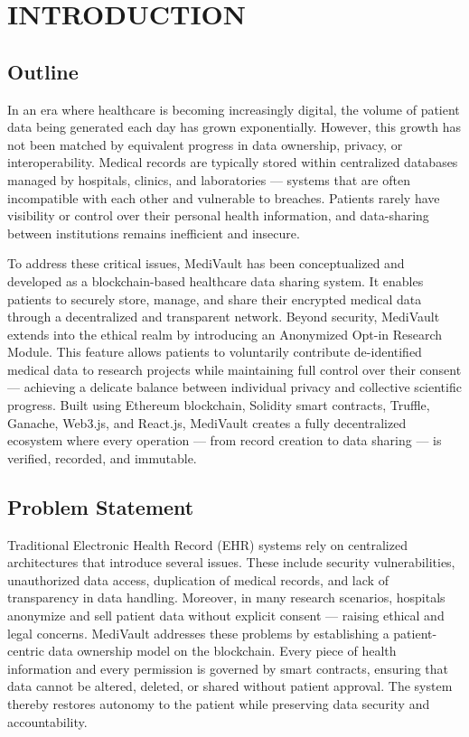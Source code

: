 \chapter{INTRODUCTION}
\label{chap:introduction}

\section{Outline}
In an era where healthcare is becoming increasingly digital, the volume of patient data being generated each day has grown exponentially. However, this growth has not been matched by equivalent progress in data ownership, privacy, or interoperability. Medical records are typically stored within centralized databases managed by hospitals, clinics, and laboratories — systems that are often incompatible with each other and vulnerable to breaches. Patients rarely have visibility or control over their personal health information, and data-sharing between institutions remains inefficient and insecure.

To address these critical issues, MediVault has been conceptualized and developed as a blockchain-based healthcare data sharing system. It enables patients to securely store, manage, and share their encrypted medical data through a decentralized and transparent network. Beyond security, MediVault extends into the ethical realm by introducing an Anonymized Opt-in Research Module. This feature allows patients to voluntarily contribute de-identified medical data to research projects while maintaining full control over their consent — achieving a delicate balance between individual privacy and collective scientific progress. Built using Ethereum blockchain, Solidity smart contracts, Truffle, Ganache, Web3.js, and React.js, MediVault creates a fully decentralized ecosystem where every operation — from record creation to data sharing — is verified, recorded, and immutable.

\section{Problem Statement}
Traditional Electronic Health Record (EHR) systems rely on centralized architectures that introduce several issues. These include security vulnerabilities, unauthorized data access, duplication of medical records, and lack of transparency in data handling. Moreover, in many research scenarios, hospitals anonymize and sell patient data without explicit consent — raising ethical and legal concerns. MediVault addresses these problems by establishing a patient-centric data ownership model on the blockchain. Every piece of health information and every permission is governed by smart contracts, ensuring that data cannot be altered, deleted, or shared without patient approval. The system thereby restores autonomy to the patient while preserving data security and accountability.


